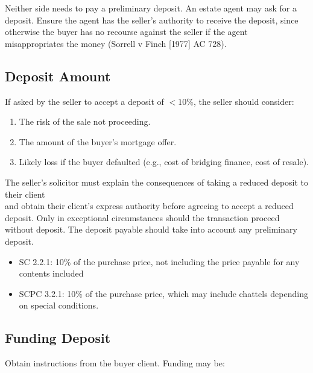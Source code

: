 \documentclass[
]{article}
\providecommand{\tightlist}{%
  \setlength{\itemsep}{0pt}\setlength{\parskip}{0pt}}
\begin{document}
Neither side needs to pay a preliminary deposit. An estate agent may ask
for a deposit. Ensure the agent has the seller's authority to receive
the deposit, since otherwise the buyer has no recourse against the
seller if the agent misappropriates the money (Sorrell v Finch
{[}1977{]} AC 728).

\hypertarget{deposit-amount}{%
\subsection{Deposit Amount}\label{deposit-amount}}

If asked by the seller to accept a deposit of {\(< 10\%\)}, the seller
should consider:

\begin{enumerate}
\tightlist
\item
  The risk of the sale not proceeding.
\item
  The amount of the buyer's mortgage offer.
\item
  Likely loss if the buyer defaulted (e.g., cost of bridging finance,
  cost of resale).
\end{enumerate}

The seller's solicitor must explain the consequences of taking a reduced
deposit to their client\\
and obtain their client's express authority before agreeing to accept a
reduced deposit. Only in exceptional circumstances should the
transaction proceed without deposit. The deposit payable should take
into account any preliminary deposit.

\begin{itemize}
\tightlist
\item
  SC 2.2.1: 10\% of the purchase price, not including the price payable
  for any contents included
\item
  SCPC 3.2.1: 10\% of the purchase price, which may include chattels
  depending on special conditions.
\end{itemize}

\hypertarget{funding-deposit}{%
\subsection{Funding Deposit}\label{funding-deposit}}

Obtain instructions from the buyer client. Funding may be:
\end{document}
